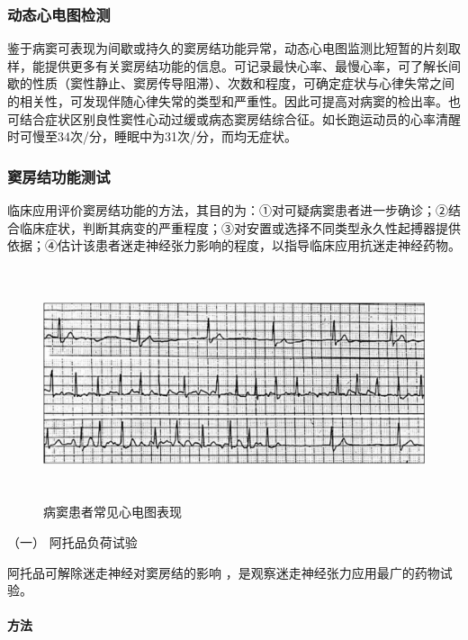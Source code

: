 \subsubsection{动态心电图检测}

鉴于病窦可表现为间歇或持久的窦房结功能异常，动态心电图监测比短暂的片刻取样，能提供更多有关窦房结功能的信息。可记录最快心率、最慢心率，可了解长间歇的性质（窦性静止、窦房传导阻滞）、次数和程度，可确定症状与心律失常之间的相关性，可发现伴随心律失常的类型和严重性。因此可提高对病窦的检出率。也可结合症状区别良性窦性心动过缓或病态窦房结综合征。如长跑运动员的心率清醒时可慢至34次/分，睡眠中为31次/分，而均无症状。

\subsubsection{窦房结功能测试}

临床应用评价窦房结功能的方法，其目的为：①对可疑病窦患者进一步确诊；②结合临床症状，判断其病变的严重程度；③对安置或选择不同类型永久性起搏器提供依据；④估计该患者迷走神经张力影响的程度，以指导临床应用抗迷走神经药物。

\begin{figure}[!htbp]
 \centering
 \includegraphics[width=6.29167in,height=2.6875in]{./images/Image00466.jpg}
 \captionsetup{justification=centering}
 \caption{病窦患者常见心电图表现}
 \label{fig102-20}
  \end{figure} 

\hypertarget{text00298.htmlux5cux23CHP10-2-11-3-4-1}{}
（一） 阿托品负荷试验

阿托品可解除迷走神经对窦房结的影响
，是观察迷走神经张力应用最广的药物试验。

\paragraph{方法}

